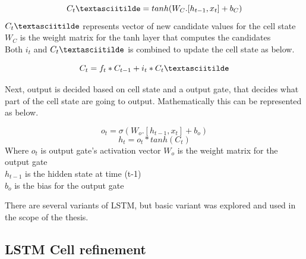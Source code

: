\begin{equation}
C_t\textasciitilde = tanh(W_C. [h_{t-1}, x_t ] + b_C)
\end{equation}
$C_t\textasciitilde$ represents vector of new candidate values for the cell state
$W_C$ is the weight matrix for the tanh layer that computes the candidates\\
Both $i_t$ and $C_t\textasciitilde$ is combined to update the cell state as below.

\begin{equation}
C_t = f_t * C_{t-1} + i_t * C_t\textasciitilde
\end{equation}

Next, output is decided based on cell state and a output gate, that decides what part of the cell state are going to output. Mathematically this can be represented as below.

\begin{equation}
o_t = \sigma(W_o. [h_{t-1}, x_t  ] + b_o)
\end{equation}
\begin{equation}
h_t = o_t  * tanh(C_t)
\end{equation}
Where $o_t$ is output gate's activation vector 
$W_o$ is the weight matrix for the output gate \\
$h_{t-1}$ is the hidden state at time (t-1) \\
$b_o$ is the bias for the output gate

There are several variants of LSTM, but basic variant was explored and used in the scope of the thesis.

\subsection{LSTM Cell refinement} \label{state_refinement}

